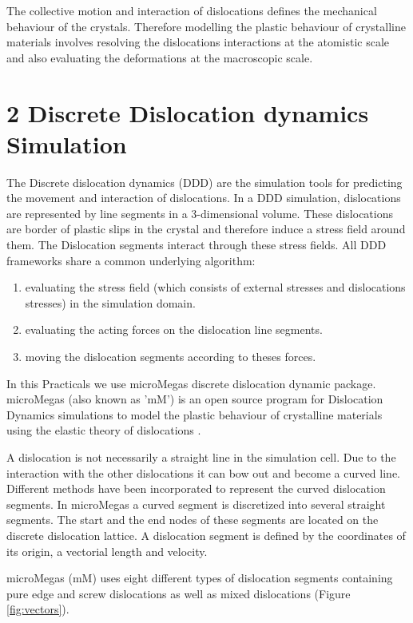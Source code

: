 The collective motion and interaction of dislocations defines the mechanical behaviour of the crystals. Therefore modelling the plastic behaviour of crystalline materials involves resolving the dislocations interactions at the atomistic scale and also evaluating the deformations at the macroscopic scale.

\section*{2 Discrete Dislocation dynamics Simulation}

The Discrete dislocation dynamics (DDD) are the simulation tools for predicting the movement and interaction of dislocations. In a DDD simulation, dislocations are represented by line segments in a 3-dimensional volume. These dislocations are border of plastic slips in the crystal and therefore induce a stress field around them. The Dislocation segments interact through these stress fields. All DDD frameworks share a common underlying algorithm:
\begin{enumerate}
    \item evaluating the stress field (which consists of external stresses and dislocations stresses) in the simulation domain.
    \item evaluating the acting forces on the dislocation line segments.
    \item moving the dislocation segments according to theses forces.
\end{enumerate}

In this Practicals we use microMegas discrete dislocation dynamic package. microMegas (also known as 'mM') is an open source program for Dislocation Dynamics simulations to model the plastic behaviour of crystalline materials using the elastic theory of dislocations \cite{devincre2011}.

A dislocation is not necessarily a straight line in the simulation cell. Due to the interaction with the other dislocations it can bow out and become a curved line. Different methods have been incorporated to represent the curved dislocation segments. In microMegas a curved segment is discretized into several straight segments. The start and the end nodes of these segments are located on the discrete dislocation lattice. A dislocation segment is defined by the coordinates of its origin, a vectorial length and velocity.

microMegas (mM) uses eight different types of dislocation segments containing pure edge and screw dislocations as well as mixed dislocations (Figure \ref{fig:vectors}).

